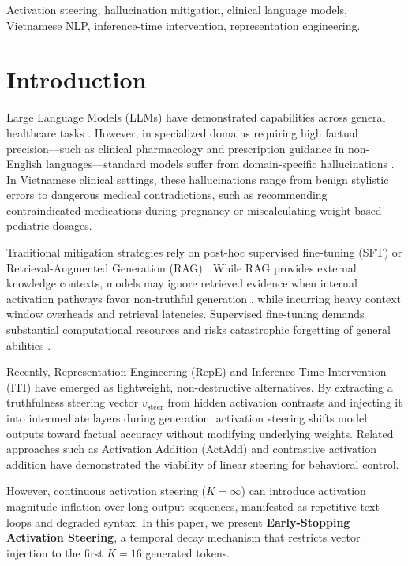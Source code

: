 \documentclass[conference]{IEEEtran}
\begin{document}
\begin{IEEEkeywords}
Activation steering, hallucination mitigation, clinical language models, Vietnamese NLP, inference-time intervention, representation engineering.
\end{IEEEkeywords}

\section{Introduction}
Large Language Models (LLMs) have demonstrated capabilities across general healthcare tasks \cite{ref3}. However, in specialized domains requiring high factual precision---such as clinical pharmacology and prescription guidance in non-English languages---standard models suffer from domain-specific hallucinations \cite{ref7}. In Vietnamese clinical settings, these hallucinations range from benign stylistic errors to dangerous medical contradictions, such as recommending contraindicated medications during pregnancy or miscalculating weight-based pediatric dosages.

Traditional mitigation strategies rely on post-hoc supervised fine-tuning (SFT) \cite{ref10} or Retrieval-Augmented Generation (RAG) \cite{ref5}. While RAG provides external knowledge contexts, models may ignore retrieved evidence when internal activation pathways favor non-truthful generation \cite{ref11}, while incurring heavy context window overheads and retrieval latencies. Supervised fine-tuning demands substantial computational resources and risks catastrophic forgetting of general abilities \cite{ref12}.

Recently, Representation Engineering (RepE) \cite{ref1} and Inference-Time Intervention (ITI) \cite{ref2} have emerged as lightweight, non-destructive alternatives. By extracting a truthfulness steering vector $v_{\text{steer}}$ from hidden activation contrasts and injecting it into intermediate layers during generation, activation steering shifts model outputs toward factual accuracy without modifying underlying weights. Related approaches such as Activation Addition (ActAdd) \cite{ref8} and contrastive activation addition \cite{ref9} have demonstrated the viability of linear steering for behavioral control.

However, continuous activation steering ($K=\infty$) can introduce activation magnitude inflation over long output sequences, manifested as repetitive text loops and degraded syntax. In this paper, we present \textbf{Early-Stopping Activation Steering}, a temporal decay mechanism that restricts vector injection to the first $K=16$ generated tokens.
\end{document}
